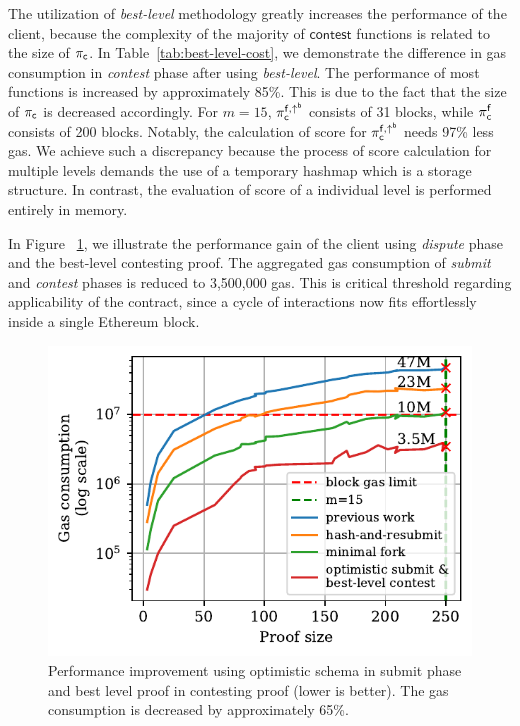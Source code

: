 The utilization of \emph{best-level} methodology greatly increases the
performance of the client, because the complexity of the majority of
$\textsf{contest}$ functions is related to the size of $\mathsf{\pi_{c}}$. In
Table~\ref{tab:best-level-cost}, we demonstrate the difference in gas
consumption in \emph{contest} phase after using \emph{best-level}. The
performance of most functions is increased by approximately 85\%. This is due
to the fact that the size of $\mathsf{\pi_{c}}$ is decreased accordingly. For $m=15$,
$\mathsf{\pi_{c}^{f, \uparrow^{b}}}$ consists of 31 blocks, while $\mathsf{\pi_{c}^{f}}$ consists of 200 blocks.
Notably, the calculation of score for $\mathsf{\pi_{c}^{f, \uparrow^{b}}}$ needs 97\% less gas. We achieve
such a discrepancy because the process of score calculation for multiple levels
demands the use of a temporary hashmap which is a storage structure. In
contrast, the evaluation of score of a individual level is performed
entirely in memory.



In Figure ~\ref{fig:dispute-best-level}, we illustrate the performance gain of
the client using \emph{dispute} phase and the best-level contesting proof. The
aggregated gas consumption of \emph{submit} and \emph{contest} phases is
reduced to 3,500,000 gas. This is critical threshold regarding
applicability of the contract, since a cycle of interactions now fits
effortlessly inside a single Ethereum block.



\begin{figure}[!h]
    \begin{center}
        \includegraphics[width=1\columnwidth]{figures/dispute-best-level.pdf}
    \end{center}
    \caption{Performance improvement using optimistic schema in submit phase
        and best level proof in contesting proof (lower is better). The gas
        consumption is decreased by approximately 65\%.}
    \label{fig:dispute-best-level}
\end{figure}
